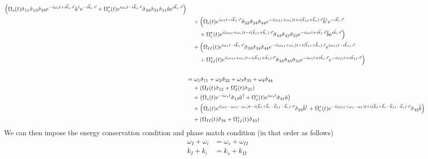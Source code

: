 \documentclass[aps,pra,showpacs,amsmath,amssymb,nofootinbib,longbibliography,superscriptaddress
]{revtex4-1}
\theoremstyle{definition}
\theoremstyle{remark}
\newcommand{\0}{\hat{0}}
\begin{document}
\begin{align}
    \left(
        \Omega_{s}(t) \hat{\sigma}_{11} \hat{\sigma}_{13} \hat{\sigma}_{33} e^{-i \omega_s t + i \vec{k}_s \cdot \vec{r}} \hat{a}^{\dagger} e^{-i \vec{k}_{s} \cdot \vec{r}} +
        \Omega_{s}^*(t) e^{i \omega_s t - i \vec{k}_s \cdot \vec{r}} \hat{\sigma}_{33} \hat{\sigma}_{31} \hat{\sigma}_{11} \hat{a} e^{i \vec{k}_{s} \cdot \vec{r}}
    \right)\nonumber \\
    &\;\;\;\;+
    \Bigl(
        \Omega_{i}(t) e^{i \omega_I t - i \vec{k}_I \cdot \vec{r}} \hat{\sigma}_{22} \hat{\sigma}_{24} \hat{\sigma}_{44} e^{-i(\omega_{II} + \omega_s) t + i(\vec{k}_{II} + \vec{k}_s) \cdot \vec{r}} \hat{b}^{\dagger} e^{-i \vec{k}_{i} \cdot \vec{r}} \nonumber \\
    &\;\;\;\;\;\;\;\;+
        \Omega_{i}^*(t) e^{i(\omega_{II} + \omega_s) t - i(\vec{k}_{II} + \vec{k}_s) \cdot \vec{r}} \hat{\sigma}_{44} \hat{\sigma}_{42} \hat{\sigma}_{22} e^{-i \omega_I t + i \vec{k}_I \cdot \vec{r}} \hat{b} e^{i \vec{k}_{i} \cdot \vec{r}}
    \Bigr)\nonumber \\
    &\;\;\;\;+
    \Bigl(
        \Omega_{II}(t) e^{i \omega_s t - i \vec{k}_s \cdot \vec{r}} \hat{\sigma}_{33} \hat{\sigma}_{34} \hat{\sigma}_{44} e^{-i(\omega_{II} + \omega_s) t + i(\vec{k}_{II} + \vec{k}_s) \cdot \vec{r}} e^{i \omega_{II} t - i \vec{k}_{II} \cdot \vec{r}} \nonumber \\
    &\;\;\;\;\;\;\;\;+
        \Omega_{II}^*(t) e^{i(\omega_{II} + \omega_s) t - i(\vec{k}_{II} + \vec{k}_s) \cdot \vec{r}} \hat{\sigma}_{44} \hat{\sigma}_{43} \hat{\sigma}_{33} e^{-i \omega_s t + i \vec{k}_s \cdot \vec{r}} e^{-i \omega_{II} t + i \vec{k}_{II} \cdot \vec{r}}
    \Bigr) \nonumber \\ \nonumber \\
    &=
    \omega_1 \hat{\sigma}_{11} + \omega_2 \hat{\sigma}_{22} + \omega_3 \hat{\sigma}_{33} + \omega_4 \hat{\sigma}_{44} \nonumber \\
    &\;\;\;\;+
    \left(
        \Omega_{I}(t) \hat{\sigma}_{12} +
        \Omega_{I}^*(t) \hat{\sigma}_{21}
    \right)\nonumber \\
    &\;\;\;\;+
    \left(
        \Omega_{s}(t) e^{-i \omega_s t} \hat{\sigma}_{13} \hat{a}^{\dagger} +
        \Omega_{s}^*(t) e^{i \omega_s t} \hat{\sigma}_{31} \hat{a}
    \right)\nonumber \\
    &\;\;\;\;+
    \left(
        \Omega_{i}(t) e^{i(\omega_I - \omega_{II} - \omega_s) t - i(\vec{k}_I + \vec{k}_{i} - \vec{k}_{II} - \vec{k}_s) \cdot \vec{r}} \hat{\sigma}_{24} \hat{b}^{\dagger} +
        \Omega_{i}^*(t) e^{-i(\omega_{II} + \omega_s - \omega_I) t + i(\vec{k}_I + \vec{k}_{i} - \vec{k}_{II} - \vec{k}_s) \cdot \vec{r}} \hat{\sigma}_{42} \hat{b}
    \right)\nonumber \\
    &\;\;\;\;+
    \left(
        \Omega_{II}(t) \hat{\sigma}_{34} +
        \Omega_{II}^*(t) \hat{\sigma}_{43}
    \right)
\end{align}
We can then impose the energy conservation condition and phase match condition (in that order as follows)
\begin{align}
    \omega_I + \omega_i &= \omega_s + \omega_{II}\\
    k_I + k_i &= k_s + k_{II}
\end{align}
\end{document}
